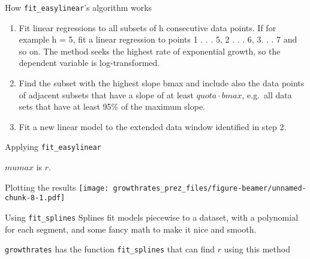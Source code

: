 \documentclass[
  ignorenonframetext,
]{beamer}
\newenvironment{Shaded}{\begin{snugshade}}{\end{snugshade}}
\newcommand{\CommentTok}[1]{\textcolor[rgb]{0.56,0.35,0.01}{\textit{#1}}}
\newcommand{\FunctionTok}[1]{\textcolor[rgb]{0.00,0.00,0.00}{#1}}
\newcommand{\NormalTok}[1]{#1}
\newcommand{\OtherTok}[1]{\textcolor[rgb]{0.56,0.35,0.01}{#1}}
\newcommand{\SpecialCharTok}[1]{\textcolor[rgb]{0.00,0.00,0.00}{#1}}
\providecommand{\tightlist}{%
  \setlength{\itemsep}{0pt}\setlength{\parskip}{0pt}}
\begin{document}
\begin{frame}{How \texttt{fit\_easylinear}'s algorithm works}
\protect\hypertarget{how-fit_easylinears-algorithm-works}{}
\begin{enumerate}
\tightlist
\item
  Fit linear regressions to all subsets of h consecutive data points. If
  for example h = 5, fit a linear regression to points 1 . . . 5, 2 . .
  . 6, 3. . . 7 and so on. The method seeks the highest rate of
  exponential growth, so the dependent variable is log-transformed.
\item
  Find the subset with the highest slope bmax and include also the data
  points of adjacent subsets that have a slope of at least
  \(quota \cdot bmax\), e.g.~all data sets that have at least 95\% of
  the maximum slope.
\item
  Fit a new linear model to the extended data window identified in step
  2.
\end{enumerate}
\end{frame}

\begin{frame}[fragile]{Applying \texttt{fit\_easylinear}}
\protect\hypertarget{applying-fit_easylinear}{}
\begin{Shaded}
\end{Shaded}

\(mumax\) is \(r\).
\end{frame}

\begin{frame}{Plotting the results}
\protect\hypertarget{plotting-the-results}{}
\texttt{[image: growthrates\_prez\_files/figure-beamer/unnamed-chunk-8-1.pdf]}
\end{frame}

\begin{frame}[fragile]{Using \texttt{fit\_splines}}
\protect\hypertarget{using-fit_splines}{}
Splines fit models piecewise to a dataset, with a polynomial for each
segment, and some fancy math to make it nice and smooth.

\texttt{growthrates} has the function \texttt{fit\_splines} that can
find \(r\) using this method

\begin{Shaded}
\end{Shaded}
\end{frame}
\end{document}
